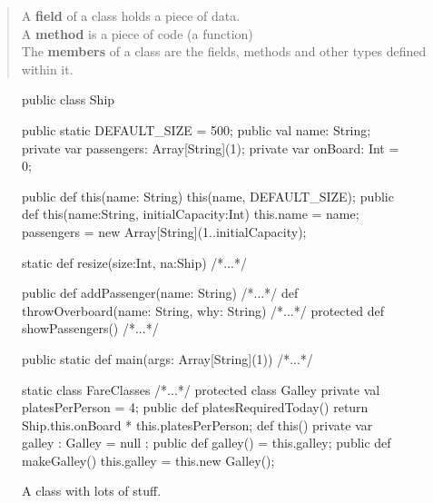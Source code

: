 \begin{quote}
A {\bf field} of a class holds a piece of data.\\
A {\bf method} is a piece of code (a function)\\
The {\bf members} of a class are the fields, methods and other types defined within it. 
\end{quote}
\begin{figure}[!htbp]
\hrulefill

\begin{xtennum}[]
public class Ship {
    public static DEFAULT_SIZE = 500;
    public  val name: String;
    private var passengers: Array[String](1);
    private var onBoard: Int = 0;
    
    public def this(name: String) {
       this(name, DEFAULT_SIZE);
    } 
    public def this(name:String, initialCapacity:Int) {
       this.name = name;  
       passengers = new Array[String](1..initialCapacity);
    }

    static def resize(size:Int, na:Ship) { /*...*/ }

    public def addPassenger(name: String) { /*...*/ }
    def throwOverboard(name: String, why: String) { /*...*/ }
    protected def showPassengers() { /*...*/ }
    
    public static def main(args: Array[String](1)) { /*...*/ } 
    
    static class FareClasses { /*...*/ }   
    protected class Galley { 
        private val platesPerPerson = 4;
        public def platesRequiredToday() {
           return Ship.this.onBoard * this.platesPerPerson;
        }
        def this(){}
     }
    private var galley : Galley = null ; 
    public def galley() = this.galley; 
    public def makeGalley() {
       this.galley = this.new Galley(); 
    }

   }
\end{xtennum}

\hrulefill
\caption{A class with lots of stuff.}\label{fig:nark}
\end{figure}
